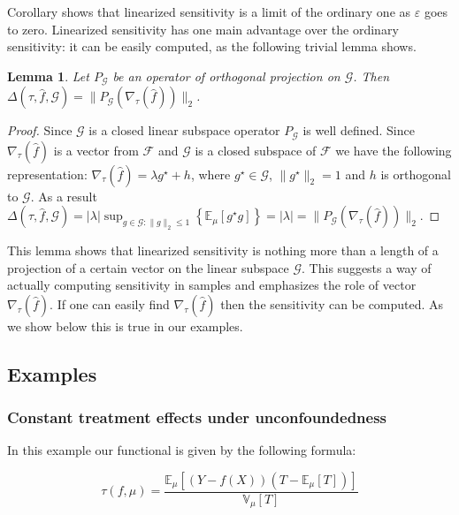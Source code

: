 \documentclass[12pt]{article}
\theoremstyle{plain}
\newtheorem{lemma}[theorem]{Lemma}
\begin{document}
Corollary shows that linearized sensitivity is a limit of the ordinary one as $\varepsilon$ goes to zero.  Linearized sensitivity has one main advantage over the ordinary sensitivity: it can be easily computed, as the following trivial lemma shows.

\begin{lemma}
 Let $P_{\mathcal{G}}$ be an operator of orthogonal projection on $\mathcal{G}$. Then $\Delta(\tau, \hat f, \mathcal{G}) = \| P_{\mathcal{G}}(\nabla_{\tau}(\hat f))\|_2$.
 \end{lemma}

\begin{proof}
 Since $\mathcal{G}$ is a closed linear subspace operator $P_{\mathcal{G}}$ is well defined. Since $\nabla_{\tau}(\hat f)$ is a vector from $\mathcal{F}$ and $\mathcal{G}$ is a closed subspace of $\mathcal{F}$ we have the following representation: $\nabla_{\tau}(\hat f) = \lambda g^{\star} + h$, where $g^{\star} \in \mathcal{G}$, $\| g^{\star}\|_2 = 1$ and $h$ is orthogonal to $\mathcal{G}$. As a result $\Delta(\tau,\hat f,\mathcal{G}) = |\lambda| \sup_{g\in \mathcal{G}: \| g\|_2\le 1}\left\{ \mathbb{E}_{\mu}[g^{\star} g]\right\}= |\lambda| = \|P_{\mathcal{G}}(\nabla_{\tau}(\hat f))\|_2 $.
 \end{proof}


This lemma shows that linearized sensitivity is nothing more than a length of a projection of a certain vector on the linear subspace $\mathcal{G}$. This suggests a way of actually computing sensitivity in samples and emphasizes the role of vector $\nabla_{\tau}(\hat f)$. If one can easily find $\nabla_{\tau}(\hat f)$ then the sensitivity can be computed. As we show below this is true in our examples.

\subsection{Examples}

\subsubsection{Constant treatment effects under unconfoundedness}

In this example our functional is given by the following formula:

\begin{equation}
\tau(f,\mu) = \frac{\mathbb{E}_{\mu}\left[(Y-f(X))(T-\mathbb{E}_{\mu}[T])\right]}{\mathbb{V}_{\mu}[T]} 
\end{equation}
\end{document}

